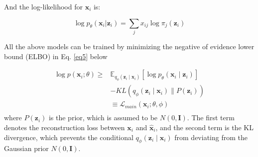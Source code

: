 And the log-likelihood for $\mathbf{x}_i$ is:

\begin{equation}
\log{
p_{\theta} { \left( \mathbf{x}_i \lvert \mathbf{z}_i \right) }
}=
\sum_{j}{
x_{ij}\log{
\pi_{j}\left( \mathbf{z}_i \right) 
}
 }
\label{eq4}
\end{equation}

All the above models can be trained by minimizing the negative of evidence lower bound (ELBO) in Eq. \ref{eq5} below

\begin{equation}
\begin{aligned}
\log p\left(\mathbf{x}_i;\theta\right) \geq& \mathbb{E}_{q_{\phi}\left(\mathbf{z}_i\mid\mathbf{x}_i\right)}\left[\log p_{\theta}\left(\mathbf{x}_i\mid\mathbf{z}_i\right)\right]\\ & - KL\left(q_{\phi}\left(\mathbf{z}_i\mid\mathbf{x}_i\right)\parallel P\left(\mathbf{z}_i\right)\right)\\&
\equiv \mathcal{L}_{main}\left(\mathbf{x}_i;\theta,\phi\right)\\
\label{eq5}
\end{aligned}
\end{equation}
where $P\left(\mathbf{z}_i\right)$ is the prior, which is assumed to be $N\left(0,\mathbf{I}\right)$. The first term denotes the reconstruction loss between $\mathbf{x}_i$ and $\hat{\mathbf{x}}_i$, and the second term is the KL divergence, which prevents the conditional
$q_{\phi}\left(\mathbf{z}_i\mid\mathbf{x}_i\right)$ from deviating from the Gaussian prior $N\left(0,\mathbf{I}\right)$.

